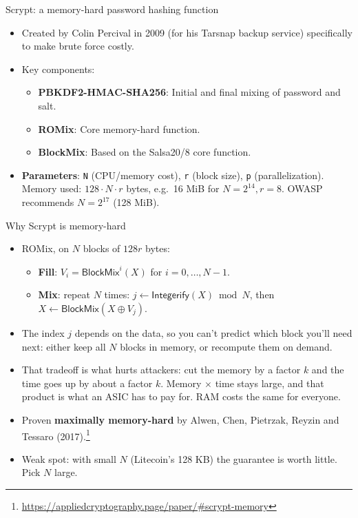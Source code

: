 \ifdefined\PRESENTATION\else\PassOptionsToClass{handout}{beamer}\fi\documentclass[aspectratio=169, lualatex]{beamer}
\begin{document}
\begin{frame}{Scrypt: a memory-hard password hashing function}
	\begin{itemize}
		\item Created by Colin Percival in 2009 (for his Tarsnap backup service) specifically to make brute force costly.
		\item Key components:
		      \begin{itemize}
			      \item \textbf{PBKDF2-HMAC-SHA256}: Initial and final mixing of password and salt.
			      \item \textbf{ROMix}: Core memory-hard function.
			      \item \textbf{BlockMix}: Based on the Salsa20/8 core function.
		      \end{itemize}
		\item \textbf{Parameters}: \texttt{N} (CPU/memory cost), \texttt{r} (block size), \texttt{p} (parallelization). Memory used: $128 \cdot N \cdot r$ bytes, e.g.\ 16 MiB for $N = 2^{14}, r = 8$. OWASP recommends $N = 2^{17}$ (128 MiB).
	\end{itemize}
\end{frame}

\begin{frame}{Why Scrypt is memory-hard}
	\begin{itemize}
		\item ROMix, on $N$ blocks of $128 r$ bytes:
		      \begin{itemize}
			      \item \textbf{Fill}: $V_i = \mathsf{BlockMix}^{i}(X)$ for $i = 0, \ldots, N-1$.
			      \item \textbf{Mix}: repeat $N$ times: $j \leftarrow \mathsf{Integerify}(X) \bmod N$, then $X \leftarrow \mathsf{BlockMix}(X \oplus V_j)$.
		      \end{itemize}
		\item The index $j$ depends on the data, so you can't predict which block you'll need next: either keep all $N$ blocks in memory, or recompute them on demand.
		\item That tradeoff is what hurts attackers: cut the memory by a factor $k$ and the time goes up by about a factor $k$. Memory $\times$ time stays large, and that product is what an ASIC has to pay for. RAM costs the same for everyone.
		\item Proven \textbf{maximally memory-hard} by Alwen, Chen, Pietrzak, Reyzin and Tessaro (2017).\footnote{\url{https://appliedcryptography.page/paper/\#scrypt-memory}}
		\item Weak spot: with small $N$ (Litecoin's 128 KB) the guarantee is worth little. Pick $N$ large.
	\end{itemize}
\end{frame}
\end{document}
